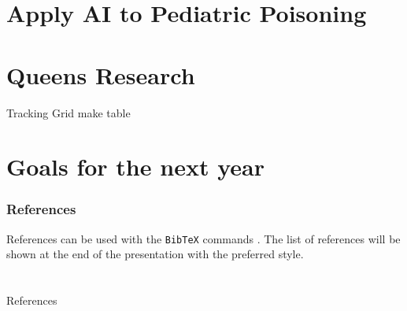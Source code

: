 \section[Les enfants]{Apply AI to Pediatric Poisoning}

\section{Queens Research}
\begin{frame}{Tracking Grid}
make table
\end{frame}

\section[Future]{Goals for the next year}
\begin{frame}
\frametitle{References}
References can be used with the \texttt{BibTeX} commands  \cite{Knuth.1986}. The list of references  will be shown at the end of the presentation with the preferred style.
\end{frame}


\section*{}
\begin{frame}[allowframebreaks]{References}
\def\newblock{\hskip .11em plus .33em minus .07em}
\scriptsize


\normalsize
\end{frame}

